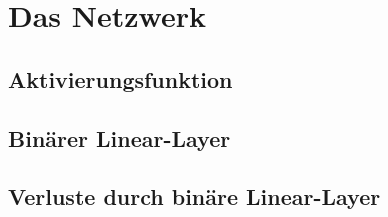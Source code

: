 \chapter{Das Netzwerk}
\section{Aktivierungsfunktion}
\section{Binärer Linear-Layer}
\section{Verluste durch binäre Linear-Layer}